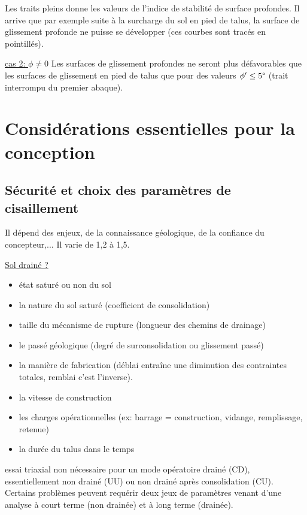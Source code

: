 Les traits pleins donne les valeurs de l'indice de stabilité de surface profondes. Il arrive que par exemple suite à la surcharge du sol en pied de talus, la surface de glissement profonde ne puisse se développer (ces courbes sont tracés en pointillés).

\underline{cas 2: $\phi \neq 0$} 
Les surfaces de glissement profondes ne seront plus défavorables que les surfaces de glissement en pied de talus que pour des valeurs $\phi' \leq 5\degree$ (trait interrompu du premier abaque).

\section{Considérations essentielles pour la conception}

\subsection{Sécurité et choix des paramètres de cisaillement}

Il dépend des enjeux, de la connaissance géologique, de la confiance du concepteur,... Il varie de 1,2 à 1,5. 

\underline{Sol drainé ?}
\begin{itemize}
    \item état saturé ou non du sol
    \item la nature du sol saturé (coefficient de consolidation)
    \item taille du mécanisme de rupture (longueur des chemins de drainage)
    \item le passé géologique (degré de surconsolidation ou glissement passé)
    \item la manière de fabrication (déblai entraîne une diminution des contraintes totales, remblai c'est l'inverse).
    \item la vitesse de construction
    \item les charges opérationnelles (ex: barrage = construction, vidange, remplissage, retenue)
    \item la durée du talus dans le temps
\end{itemize}

essai triaxial non nécessaire pour un mode opératoire drainé (CD), essentiellement non drainé (UU) ou non drainé après consolidation (CU). Certains problèmes peuvent requérir deux jeux de paramètres venant d'une analyse à court terme (non drainée) et à long terme (drainée).

